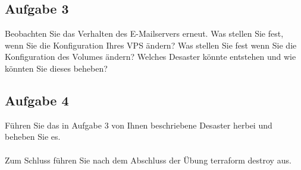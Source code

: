 \documentclass{article}
\begin{document}
    \subsection{Aufgabe 3}
    Beobachten Sie das Verhalten des E-Mailservers erneut. Was stellen Sie fest, wenn Sie die Konfiguration Ihres VPS ändern? Was stellen Sie fest wenn Sie die Konfiguration des Volumes ändern?
    Welches Desaster könnte entstehen und wie könnten Sie dieses beheben?
    \subsection{Aufgabe 4}
    Führen Sie das in Aufgabe 3 von Ihnen beschriebene Desaster herbei und beheben Sie es.  \\ \\
    Zum Schluss führen Sie nach dem Abschluss der Übung terraform destroy aus.
\end{document}
